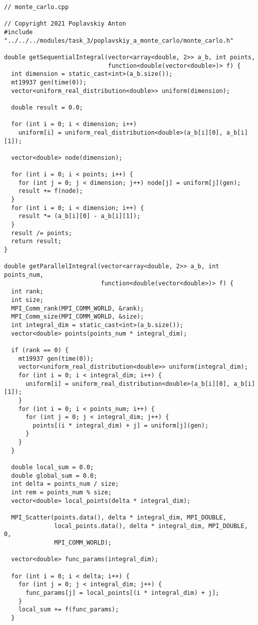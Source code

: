\documentclass{report}
\begin{document}
\begin{lstlisting}
// monte_carlo.cpp

// Copyright 2021 Poplavskiy Anton
#include "../../../modules/task_3/poplavskiy_a_monte_carlo/monte_carlo.h"

double getSequentialIntegral(vector<array<double, 2>> a_b, int points,
                             function<double(vector<double>)> f) {
  int dimension = static_cast<int>(a_b.size());
  mt19937 gen(time(0));
  vector<uniform_real_distribution<double>> uniform(dimension);

  double result = 0.0;

  for (int i = 0; i < dimension; i++)
    uniform[i] = uniform_real_distribution<double>(a_b[i][0], a_b[i][1]);

  vector<double> node(dimension);
   
  for (int i = 0; i < points; i++) {
    for (int j = 0; j < dimension; j++) node[j] = uniform[j](gen);
    result += f(node);
  }
  for (int i = 0; i < dimension; i++) {
    result *= (a_b[i][0] - a_b[i][1]);
  }
  result /= points;
  return result;
}

double getParallelIntegral(vector<array<double, 2>> a_b, int points_num,
                           function<double(vector<double>)> f) {
  int rank;
  int size;
  MPI_Comm_rank(MPI_COMM_WORLD, &rank);
  MPI_Comm_size(MPI_COMM_WORLD, &size);
  int integral_dim = static_cast<int>(a_b.size());
  vector<double> points(points_num * integral_dim);

  if (rank == 0) {
    mt19937 gen(time(0));
    vector<uniform_real_distribution<double>> uniform(integral_dim);
    for (int i = 0; i < integral_dim; i++) {
      uniform[i] = uniform_real_distribution<double>(a_b[i][0], a_b[i][1]);
    }
    for (int i = 0; i < points_num; i++) {
      for (int j = 0; j < integral_dim; j++) {
        points[(i * integral_dim) + j] = uniform[j](gen);
      }
    }
  }

  double local_sum = 0.0;
  double global_sum = 0.0;
  int delta = points_num / size;
  int rem = points_num % size;
  vector<double> local_points(delta * integral_dim);

  MPI_Scatter(points.data(), delta * integral_dim, MPI_DOUBLE,
              local_points.data(), delta * integral_dim, MPI_DOUBLE, 0,
              MPI_COMM_WORLD);

  vector<double> func_params(integral_dim);

  for (int i = 0; i < delta; i++) {
    for (int j = 0; j < integral_dim; j++) {
      func_params[j] = local_points[(i * integral_dim) + j];
    }
    local_sum += f(func_params);
  }


\end{lstlisting}
\end{document}
